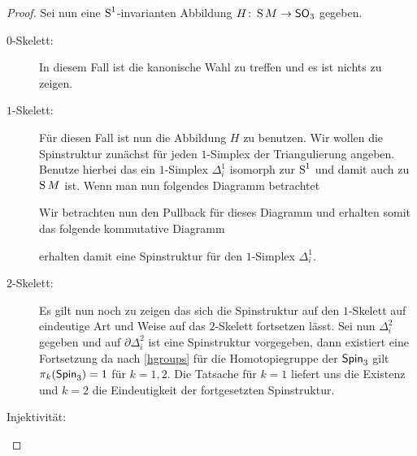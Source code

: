 \begin{Satz}
\begin{proof}
	Sei nun eine $\S^1$-invarianten Abbildung $\abb{H}{\S M}{\so{3}}$ gegeben.
	\begin{description}
		\item[$0$-Skelett:] In diesem Fall ist die kanonische Wahl zu treffen und es
			ist nichts zu zeigen.
		\item[$1$-Skelett:] Für diesen Fall ist nun die Abbildung $H$ zu benutzen. Wir wollen die Spinstruktur zunächst
		für jeden $1$-Simplex der Triangulierung angeben. 
		Benutze hierbei das ein $1$-Simplex $\Delta^1_i$ isomorph
		zur $\S^1$ und damit auch zu $\S M$ ist. Wenn man nun
		folgendes Diagramm betrachtet
		\begin{center}
		\end{center}
			Wir betrachten nun den Pullback für dieses Diagramm
			und erhalten somit das folgende kommutative Diagramm
		\begin{center}
		\end{center}
	 erhalten damit eine Spinstruktur für den $1$-Simplex
		$\Delta^1_i$. 
		\item[$2$-Skelett:] Es gilt nun noch zu zeigen das sich
		die Spinstruktur auf den $1$-Skelett auf eindeutige Art
		und Weise auf das $2$-Skelett fortsetzen lässt.
		Sei nun $\Delta^2_i$ gegeben und auf $\partial\Delta^2_i$
		ist eine Spinstruktur vorgegeben, dann existiert eine 
		Fortsetzung da nach \cref{hgroups} für die Homotopiegruppe
		der $\spin{3}$ gilt $\pi_k(\spin{3})=1$ für $k=1,2$.
		Die Tatsache für $k=1$ liefert uns die Existenz und $k=2$
		die Eindeutigkeit der fortgesetzten Spinstruktur.
		\item[Injektivität:] 
	\end{description}
\end{proof}
\end{Satz}




